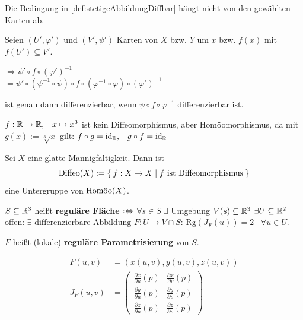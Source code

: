 \begin{bemerkung}
    Die Bedingung in \cref{def:stetigeAbbildungDiffbar} hängt nicht
    von den gewählten Karten ab.
\end{bemerkung}

\begin{beweis}
    Seien $(U', \varphi')$ und $(V', \psi')$ Karten von $X$ bzw. $Y$
    um $x$ bzw. $f(x)$ mit $f(U') \subseteq V'$.
    
    $\Rightarrow \psi' \circ f \circ (\varphi')^{-1}$\\
    $= \psi' \circ ( \psi^{-1} \circ \psi) \circ f \circ (\varphi^{-1} \circ \varphi ) \circ (\varphi')^{-1}$

    ist genau dann differenzierbar, wenn $\psi \circ f \circ \varphi^{-1}$
    differenzierbar ist.
\end{beweis}

\begin{beispiel}
    $f: \mdr \rightarrow \mdr, \;\;\; x \mapsto x^3$ ist kein
    Diffeomorphismus, aber Homöomorphismus, da mit $g(x) := \sqrt[3]{x}$
    gilt: $f \circ g = \id_\mdr, \;\;\; g \circ f = \id_\text{\mdr}$
\end{beispiel}

\begin{bemerkung}
    Sei $X$ eine glatte Mannigfaltigkeit. Dann ist
    \[\Diffeo(X) := \Set{f:X \rightarrow X | f \text{ ist Diffeomorphismus}}\]
    eine Untergruppe von $\Homoo(X)$.
\end{bemerkung}

\begin{definition}\label{def:8.5}%
    $S \subseteq \mdr^3$ heißt \textbf{reguläre Fläche} $:\gdw$
    $\forall s \in S\;\exists $ Umgebung $V(s) \subseteq \mdr^3$ $\exists U \subseteq \mdr^2$ offen: 
    $\exists \text{ differenzierbare Abbildung } F: U \rightarrow V \cap S$: 
    $\text{Rg}(J_F(u)) = 2\;\;\;\forall u \in U$.

    $F$ heißt (lokale) \textbf{reguläre Parametrisierung} von $S$.

    \begin{align*}
        F(u,v) &= \left (x(u,v), y(u,v), z(u,v) \right )\\
        J_F(u,v) &= \begin{pmatrix}
            \frac{\partial x}{\partial u} (p) & \frac{\partial x}{\partial v} (p)\\
            \frac{\partial y}{\partial u} (p) & \frac{\partial y}{\partial v} (p)\\
            \frac{\partial z}{\partial u} (p) & \frac{\partial z}{\partial v} (p)
        \end{pmatrix}
    \end{align*}
\end{definition}

